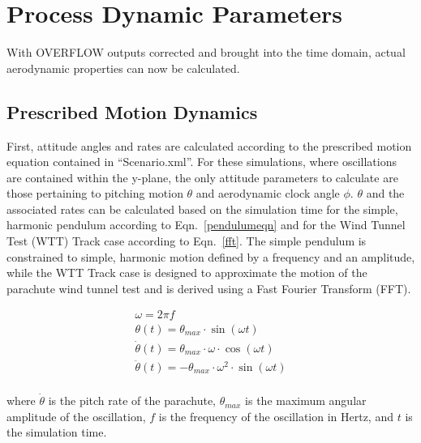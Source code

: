 \documentclass[]{aiaa-tc}%
\begin{document}
\section{Process Dynamic Parameters} %



With OVERFLOW outputs corrected and brought into the time domain, actual aerodynamic properties can now be calculated.

\subsection{Prescribed Motion Dynamics}

First, attitude angles and rates are calculated according to the prescribed motion equation contained in ``Scenario.xml''.  For these simulations, where oscillations are contained within the y-plane, the only attitude parameters to calculate are those pertaining to pitching motion $\theta$ and aerodynamic clock angle $\phi$.  $\theta$ and the associated rates can be calculated based on the simulation time for the simple, harmonic pendulum according to Eqn.~\ref{pendulumeqn} and for the Wind Tunnel Test (WTT) Track case according to Eqn.~\ref{fft}.  The simple pendulum is constrained to simple, harmonic motion defined by a frequency and an amplitude, while the WTT Track case is designed to approximate the motion of the parachute wind tunnel test and is derived using a Fast Fourier Transform (FFT).

\begin{equation} \label{pendulumeqn}
\begin{gathered}
\omega =  2\pi f \\
\theta(t) = \theta_{max} \cdot \sin(\omega t) \\
\dot{\theta}(t) = \theta_{max} \cdot  \omega \cdot \cos(\omega t) \\
\ddot{\theta}(t) = -\theta_{max} \cdot  \omega^2 \cdot \sin(\omega t) \\
\end{gathered}
\end{equation}

\noindent where $\dot{\theta}$ is the pitch rate of the parachute, $\theta_{max}$ is the maximum angular amplitude of the oscillation, $f$ is the frequency of the oscillation in Hertz, and $t$ is the simulation time.
\end{document}
